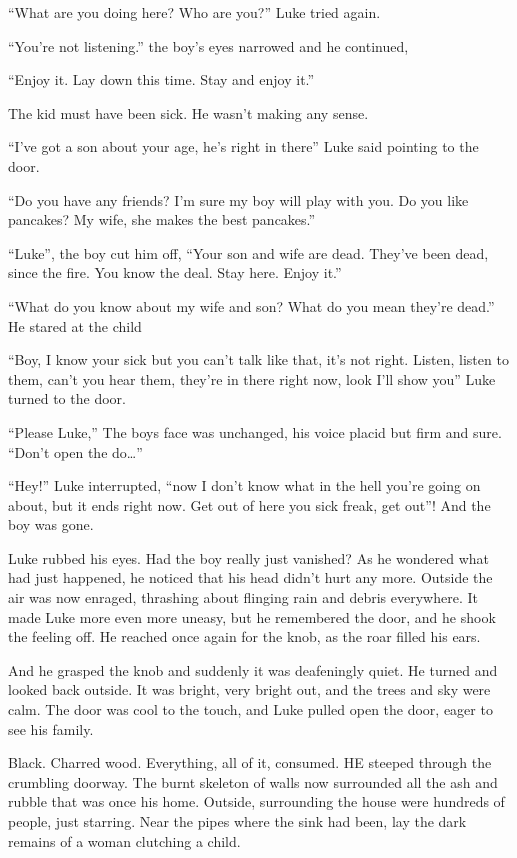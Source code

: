 ``What are you doing here? Who are you?'' Luke tried
again.

``You're not listening.'' the boy's eyes
narrowed and he continued,

``Enjoy it. Lay down this time. Stay and enjoy
it.''



The kid must have been sick. He wasn't making any
sense.

``I've got a son about your age, he's right in
there'' Luke said pointing to the door.

``Do you have any friends? I'm sure my boy will play
with you. Do you like pancakes? My wife, she makes the best
pancakes.''

``Luke'', the boy cut him off, ``Your son and wife
are dead. They've been dead, since the fire. You know the
deal. Stay here. Enjoy it.''

``What do you know about my wife and son? What do you mean
they're dead.'' He stared at the child

``Boy, I know your sick but you can't talk like that,
it's not right. Listen, listen to them, can't you hear
them, they're in there right now, look I'll show
you'' Luke turned to the door.

``Please Luke,'' The boys face was unchanged, his voice
placid but firm and sure. ``Don't open the
do{\ldots}''

``Hey!'' Luke interrupted, ``now I don't know
what in the hell you're going on about, but it ends right
now. Get out of here you sick freak, get out''! And the boy
was gone.

Luke rubbed his eyes. Had the boy really just vanished? As he
wondered what had just happened, he noticed that his head
didn't hurt any more. Outside the air was now enraged,
thrashing about flinging rain and debris everywhere. It made Luke
more even more uneasy, but he remembered the door, and he shook the
feeling off. He reached once again for the knob, as the roar filled
his ears.

And he grasped the knob and suddenly it was deafeningly quiet. He
turned and looked back outside. It was bright, very bright out, and
the trees and sky were calm. The door was cool to the touch, and
Luke pulled open the door, eager to see his family.

Black. Charred wood. Everything, all of it, consumed. HE steeped
through the crumbling doorway. The burnt skeleton of walls now
surrounded all the ash and rubble that was once his home. Outside,
surrounding the house were hundreds of people, just starring. Near
the pipes where the sink had been, lay the dark remains of a woman
clutching a child.

